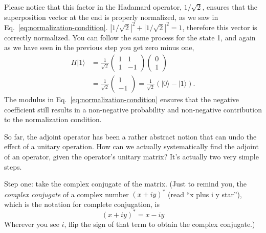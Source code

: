 Please notice that this factor in the Hadamard operator, $1/\sqrt{2}$, ensures that the superposition vector at the end is properly normalized, as we saw in Eq.~\ref{eq:normalization-condition}. $|1/\sqrt{2}|^2 + |1/\sqrt{2}|^2 = 1$, therefore this vector is correctly normalized. You can follow the same process for the state 1, and again as we have seen in the previous step you get zero minus one,
\begin{equation}
\begin{aligned}
H|1\rangle &=\frac{1}{\sqrt{2}}\left(\begin{array}{cc}
1 & 1 \\
1 & -1
\end{array}\right)\left(\begin{array}{l}
0 \\
1
\end{array}\right) \\
&=\frac{1}{\sqrt{2}}\left(\begin{array}{c}
1 \\
-1
\end{array}\right)=\frac{1}{\sqrt{2}}(|0\rangle-|1\rangle).
\end{aligned}
\end{equation}
The modulus in Eq.~\ref{eq:normalization-condition} ensures that the negative coefficient still results in a non-negative probability and non-negative contribution to the normalization condition.

So far, the adjoint operator has been a rather abstract notion that can undo the effect of a unitary operation. How can we actually systematically find the adjoint 
of an operator, given the operator's unitary matrix? It's actually two very simple steps.
 
Step one: take the complex conjugate of the matrix. (Just to remind you, the \emph{complex conjugate} of a complex number $(x+iy)^*$ (read ``x plus i y star''), which is the notation for complete conjugation, is
\begin{equation}
(x+i y)^{*}=x-i y
\end{equation}
Wherever you see $i$, flip the sign of that term to obtain the complex conjugate.)

